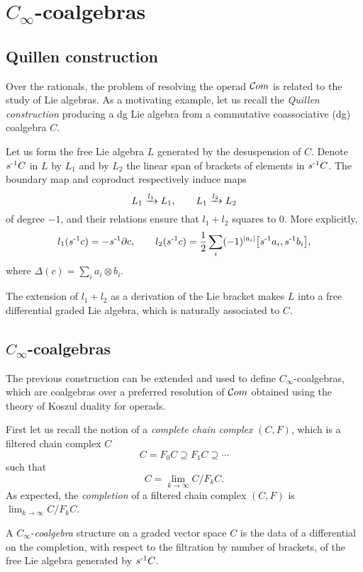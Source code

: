 
\section{\texorpdfstring{$C_\infty$}{C-infty}-coalgebras} \label{s:rationally}



\subsection{Quillen construction}

Over the rationals, the problem of resolving the operad $\mathcal{C}om$ is related to the study of Lie algebras.
As a motivating example, let us recall the \textit{Quillen construction} producing a dg Lie algebra from a commutative coassociative (dg) coalgebra $C$.

Let us form the free Lie algebra $L$ generated by the desuspension of $C$.
Denote $s^{\mbox{\scriptsize -1}}C$ in $L$ by $L_1$ and by $L_2$ the linear span of brackets of elements in $s^{\mbox{\scriptsize -1}}C$.
The boundary map and coproduct respectively induce maps
\[
L_1 \xrightarrow{l_1} L_1,
\qquad
L_1 \xrightarrow{l_2} L_2
\]
of degree $-1$, and their relations ensure that $l_1 + l_2$ squares to $0$.
More explicitly,
\[
l_1(s^{\mbox{\scriptsize -1}}c) = -s^{\mbox{\scriptsize -1}} \partial c,
\qquad
l_2(s^{\mbox{\scriptsize -1}}c) = \frac{1}{2} \sum_i (-1)^{\lvert a_i\rvert} \big[ s^{\mbox{\scriptsize -1}}a_i, s^{\mbox{\scriptsize -1}}b_i \big],
\]
where $\Delta(c) = \sum_i a_i \otimes b_i$.

The extension of $l_1 + l_2$ as a derivation of the Lie bracket makes $L$ into a free differential graded Lie algebra, which is naturally associated to $C$.

\subsection{\texorpdfstring{$C_\infty$}{C-infinity}-coalgebras}

The previous construction can be extended and used to define $C_\infty$-coalgebras, which are coalgebras over a preferred resolution of $\mathcal{C}om$ obtained using the theory of Koszul duality for operads.

First let us recall the notion of a \textit{complete chain complex} $(C, F)$, which is a filtered chain complex $C$
\[
C = F_0 C \supseteq F_1 C \supseteq \cdots
\]
such that
\[
C = \lim_{k\to \infty} C / F_k C.
\]
As expected, the \textit{completion} of a filtered chain complex $(C, F)$ is $\lim_{k\to \infty} C / F_k C$.

A $C_\infty$-\textit{coalgebra} structure on a graded vector space $C$ is the data of a differential on the completion, with respect to the filtration by number of brackets, of the free Lie algebra generated by $s^{\mbox{\scriptsize -1}}C$.

